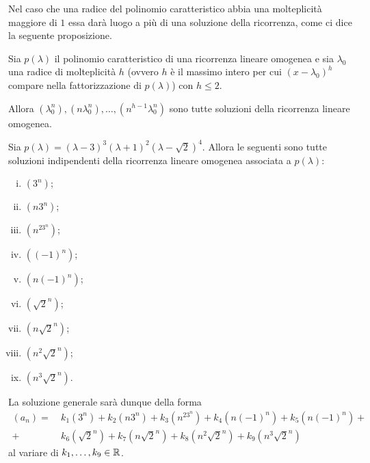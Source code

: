 Nel caso che una radice del polinomio caratteristico abbia una molteplicità maggiore di $1$ essa darà luogo a più di una soluzione della ricorrenza, come ci dice la seguente proposizione.
\begin{proposition}
    Sia $p(\lambda)$ il polinomio caratteristico di una ricorrenza lineare omogenea e sia $\lambda_0$ una radice di molteplicità $h$ (ovvero $h$ è il massimo intero per cui $(x - \lambda_0)^h$ compare nella fattorizzazione di $p(\lambda)$) con $h \leq 2$. 
    
    Allora $(\lambda_0^n), (n\lambda_0^n), \dots, (n^{h-1}\lambda_0^n)$ sono tutte soluzioni della ricorrenza lineare omogenea.
\end{proposition}

\begin{example}
    Sia $p(\lambda) = (\lambda - 3)^3(\lambda + 1)^2(\lambda - \sqrt2)^4$. Allora le seguenti sono tutte soluzioni indipendenti della ricorrenza lineare omogenea associata a $p(\lambda)$:
    \begin{multicols}{3}
        \begin{enumerate}[(i)]
        \item $(3^n)$;
        \item $(n3^n)$;
        \item $(n^23^n)$;
        \item $((-1)^n)$;
        \item $(n(-1)^n)$;
        \item $(\sqrt{2}^n)$;
        \item $(n\sqrt{2}^n)$;
        \item $(n^2\sqrt{2}^n)$;
        \item $(n^3\sqrt{2}^n)$.
    \end{enumerate}
    \end{multicols}
    
    La soluzione generale sarà dunque della forma \begin{align*}
        (a_n) = 
            &\ k_1(3^n) + k_2(n3^n) + k_3(n^23^n) + k_4(n(-1)^n) + k_5(n(-1)^n) + \\
            + &\ k_6(\sqrt{2}^n) + k_7(n\sqrt{2}^n) + k_8(n^2\sqrt{2}^n) + k_9(n^3\sqrt{2}^n)
    \end{align*}
    al variare di $k_1, \dots, k_9 \in \mathbb{R}$.
\end{example}
